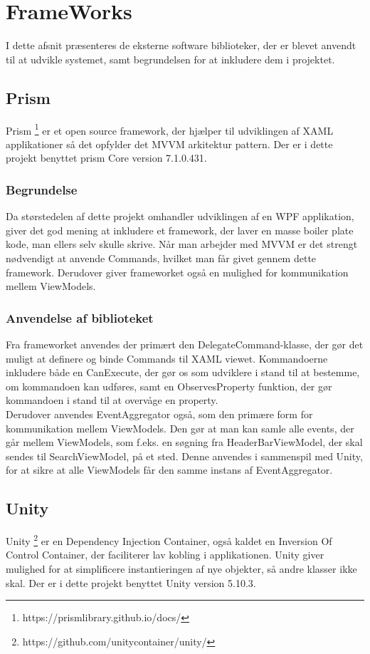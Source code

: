 \documentclass[Implementering/Implementering_main.tex]{subfiles}
\begin{document}
\section{FrameWorks}
I dette afsnit præsenteres de eksterne software biblioteker, der er blevet anvendt til at udvikle systemet, samt begrundelsen for at inkludere dem i projektet.

\subsection{Prism}
Prism \footnote{https://prismlibrary.github.io/docs/} er et open source framework, der hjælper til udviklingen af XAML applikationer så det opfylder det MVVM arkitektur pattern. Der er i dette projekt benyttet prism Core version 7.1.0.431.   
\subsubsection{Begrundelse}
Da størstedelen af dette projekt omhandler udviklingen af en WPF applikation, giver det god mening at inkludere et framework, der laver en masse boiler plate kode, man ellers selv skulle skrive. Når man arbejder med MVVM er det strengt nødvendigt at anvende Commands, hvilket man får givet gennem dette framework. Derudover giver frameworket også en mulighed for kommunikation mellem ViewModels.
\subsubsection{Anvendelse af biblioteket}
Fra frameworket anvendes der primært den DelegateCommand-klasse, der gør det muligt at definere og binde Commands til XAML viewet. Kommandoerne inkludere både en CanExecute, der gør os som udviklere i stand til at bestemme, om kommandoen kan udføres, samt en ObservesProperty funktion, der gør kommandoen i stand til at overvåge en property.\\
Derudover anvendes EventAggregator også, som den primære form for kommunikation mellem ViewModels. Den gør at man kan samle alle events, der går mellem ViewModels, som f.eks. en søgning fra HeaderBarViewModel, der skal sendes til SearchViewModel, på et sted. Denne anvendes i sammenspil med Unity, for at sikre at alle ViewModels får den samme instans af EventAggregator.

\subsection{Unity}
Unity \footnote{https://github.com/unitycontainer/unity/} er en Dependency Injection Container, også kaldet en Inversion Of Control Container, der faciliterer lav kobling i applikationen. Unity giver mulighed for at simplificere instantieringen af nye objekter, så andre klasser ikke skal. Der er i dette projekt benyttet Unity version 5.10.3.  
\end{document}
